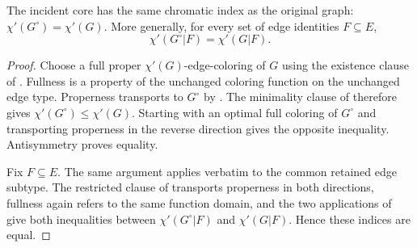 \begin{lemma}
The incident core has the same chromatic index as the original graph:
$\chi'(G^{\circ})=\chi'(G)$.  More generally, for every set of edge
identities $F\subseteq E$,
\[
 \chi'(G^{\circ}|F)=\chi'(G|F).
\]
\end{lemma}
\begin{proof}
Choose a full proper $\chi'(G)$-edge-coloring of $G$ using the existence
clause of .  Fullness is a property of the
unchanged coloring function on the unchanged edge type.  Properness
transports to $G^{\circ}$ by
.  The minimality clause of
 therefore gives
$\chi'(G^{\circ})\leq\chi'(G)$.  Starting with an optimal full coloring of
$G^{\circ}$ and transporting properness in the reverse direction gives the
opposite inequality.  Antisymmetry proves equality.

Fix $F\subseteq E$.  The same argument applies verbatim to the common
retained edge subtype.  The restricted clause of
 transports properness in both
directions, fullness again refers to the same function domain, and the two
applications of  give both inequalities between
$\chi'(G^{\circ}|F)$ and $\chi'(G|F)$.  Hence these indices are equal.
\end{proof}
